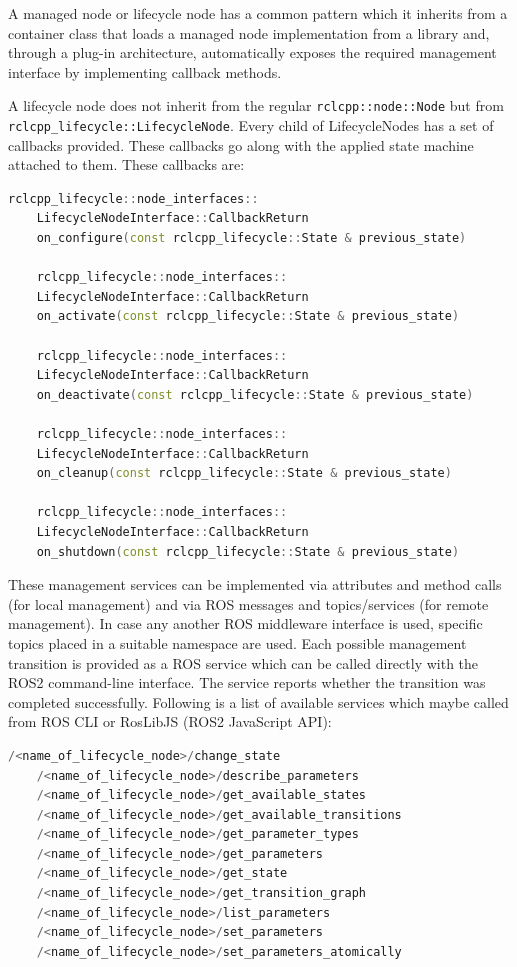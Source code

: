 	A managed node or lifecycle node has a common pattern which it inherits from a container class that loads a managed node implementation from a library and, through a plug-in architecture, automatically exposes the required management interface by implementing callback methods. 

	A lifecycle node does not inherit from the regular \lstinline{rclcpp::node::Node} but from\\  \lstinline{rclcpp_lifecycle::LifecycleNode}. Every child of LifecycleNodes has a set of callbacks provided. These callbacks go along with the applied state machine attached to them. These callbacks are:

\begin{lstlisting}[language=cpp,
	caption={Transition Callbacks}, 
	label={code:TransitionCallbacks}]
	rclcpp_lifecycle::node_interfaces::
	LifecycleNodeInterface::CallbackReturn
	on_configure(const rclcpp_lifecycle::State & previous_state)

	rclcpp_lifecycle::node_interfaces::
	LifecycleNodeInterface::CallbackReturn
	on_activate(const rclcpp_lifecycle::State & previous_state)

	rclcpp_lifecycle::node_interfaces::
	LifecycleNodeInterface::CallbackReturn
	on_deactivate(const rclcpp_lifecycle::State & previous_state)

	rclcpp_lifecycle::node_interfaces::
	LifecycleNodeInterface::CallbackReturn
	on_cleanup(const rclcpp_lifecycle::State & previous_state)

	rclcpp_lifecycle::node_interfaces::
	LifecycleNodeInterface::CallbackReturn
	on_shutdown(const rclcpp_lifecycle::State & previous_state)

\end{lstlisting}

These management services can be implemented via attributes and method calls (for local management) and via ROS messages and topics/services (for remote management). In case any another ROS middleware interface is used, specific topics placed in a suitable namespace are used. Each possible management transition is provided as a ROS service which can be called directly with the ROS2 command-line interface. The service reports whether the transition was completed successfully. Following is a list of available services which maybe called from ROS CLI or RosLibJS (ROS2 JavaScript API): 

\begin{lstlisting}[language=cpp,
	caption={Available Services for a Lifecycle Node}, 
	label={code:ROS2:AvailableServices}]
	/<name_of_lifecycle_node>/change_state
	/<name_of_lifecycle_node>/describe_parameters
	/<name_of_lifecycle_node>/get_available_states
	/<name_of_lifecycle_node>/get_available_transitions
	/<name_of_lifecycle_node>/get_parameter_types
	/<name_of_lifecycle_node>/get_parameters
	/<name_of_lifecycle_node>/get_state
	/<name_of_lifecycle_node>/get_transition_graph
	/<name_of_lifecycle_node>/list_parameters
	/<name_of_lifecycle_node>/set_parameters
	/<name_of_lifecycle_node>/set_parameters_atomically
\end{lstlisting}

